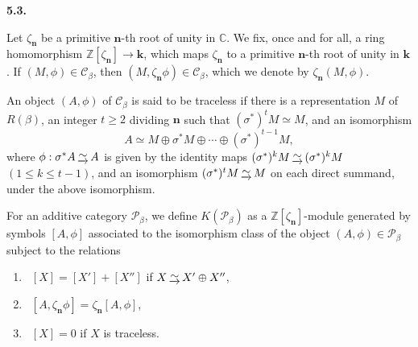 \documentclass[12pt]{amsart}
\renewcommand\b{\beta}
\newcommand\z{\zeta}
\newcommand\s{\sigma}
\newcommand\f{\phi}
\renewcommand{\1}{\mathbb 1}
\newcommand{\ZZ}{\mathbb Z}
\newcommand{\CC}{\mathbb C}
\newcommand\Bk{\mathbf k}
\newcommand\Bn{\mathbf n}
\newcommand\SC{\mathscr{C}}
\newcommand\SP{\mathscr{P}}
\newcommand{\isom}{\,\raise2pt\hbox{$\underrightarrow{\sim}$}\,}
\numberwithin{equation}{section}
\def \para#1{\par\medskip\textbf{#1}
              \addtocounter{thm}{1}}
\begin{document}
\para{5.3.}
Let $\z_{\Bn}$ be a primitive $\Bn$-th root of unity in $\CC$.
We fix, once and for all, a ring homomorphism $\ZZ[\z_{\Bn}] \to \Bk$,
which maps $\z_{\Bn}$ to a primitive $\Bn$-th root of unity in $\Bk$.
If $(M, \f) \in \SC_{\b}$, then $(M, \z_{\Bn}\f) \in \SC_{\b}$, which we denote by
$\z_{\Bn}(M, \f)$. 
\par
An object $(A, \f)$ of $\SC_{\b}$ is said to be traceless if there is
a representation $M$ of $R(\b)$, an integer $t \ge 2$ dividing $\Bn$ such that
$(\s^*)^tM  \simeq M$, and an isomorphism
\begin{equation*}
A \simeq M \oplus \s^*M \oplus \cdots \oplus (\s^*)^{t-1}M,
\end{equation*}
where $\f : \s^*A \isom A$ is given by the identity maps $(\s^*)^kM \isom (\s^*)^kM$
$(1 \le k \le t-1)$, and an isomorphism $(\s^*)^tM \isom M$ on each
direct summand, under the above isomorphism.
\par
For an additive category $\SP_{\b}$, we define $K(\SP_{\b})$ 
as a $\ZZ[\z_{\Bn}]$-module generated by
symbols $[A, \f]$ associated to the isomorphism class of the object $(A, \f) \in \SP_{\b}$
subject to the relations
\begin{enumerate}
\item \ $[X] = [X'] + [X'']$ if $X \isom X' \oplus X''$,
\item \ $[A, \z_{\Bn}\f] = \z_{\Bn}[A, \f]$,
\item \ $[X] = 0$ if $X$ is traceless.  
\end{enumerate}  
\end{document}
